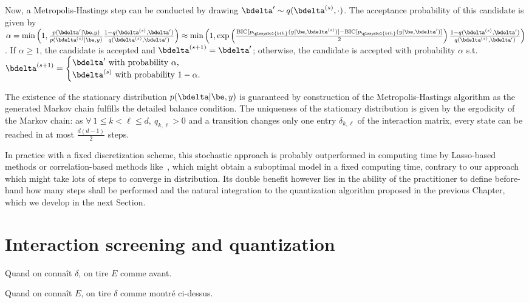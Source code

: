 Now, a Metropolis-Hastings step can be conducted by drawing $\bdelta' \sim q(\bdelta^{(s)},\cdot)$. The acceptance probability of this candidate is given by $\alpha = \min \left( 1, \frac{p(\bdelta' | \be,y)}{p(\bdelta^{(s)} | \be, y)} \frac{1-q(\bdelta^{(s)},\bdelta')}{q(\bdelta^{(s)},\bdelta')} \right) \approx \min \left( 1, \exp \left( \frac{\text{BIC}[p_{\glssymbol{bth}}(y | \be, \bdelta^{(s)})] - \text{BIC}[p_{\glssymbol{bth}}(y | \be, \bdelta')]}{2} \right) \frac{1-q(\bdelta^{(s)},\bdelta')}{q(\bdelta^{(s)},\bdelta')} \right)$. If $\alpha \geq 1$, the candidate is accepted and $\bdelta^{(s+1)} = \bdelta'$; otherwise, the candidate is accepted with probability $\alpha$ s.t.\ $\bdelta^{(s+1)} = \begin{cases} \bdelta' \text{ with probability } \alpha, \\ \bdelta^{(s)} \text{ with probability } 1-\alpha. \end{cases}$

The existence of the stationary distribution $p(\bdelta | \be,y)$ is guaranteed by construction of the Metropolis-Hastings algorithm as the generated Markov chain fulfills the detailed balance condition. The uniqueness of the stationary distribution is given by the ergodicity of the Markov chain: as $\forall \: 1 \leq  k < \ell \leq d, \: q_{k,\ell} > 0$ and a transition changes only one entry $\delta_{k,\ell}$ of the interaction matrix, every state can be reached in at most $\frac{d(d-1)}{2}$ steps.

In practice with a fixed discretization scheme, this stochastic approach is probably outperformed in computing time by Lasso-based methods or correlation-based methods like~\cite{simon}, which might obtain a suboptimal model in a fixed computing time, contrary to our approach which might take lots of steps to converge in distribution. Its double benefit however lies in the ability of the practitioner to define before-hand how many steps shall be performed and the natural integration to the quantization algorithm proposed in the previous Chapter, which we develop in the next Section.

\section{Interaction screening and quantization}

Quand on connaît $\delta$, on tire $E$ comme avant.

Quand on connaît $E$, on tire $\delta$ comme montré ci-dessus.

